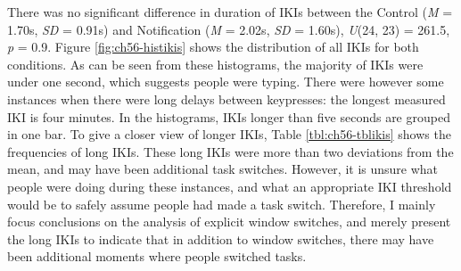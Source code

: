 There was no significant difference in duration of IKIs between the Control (\textit{M} = 1.70s, \textit{SD} = 0.91s) and Notification (\textit{M} = 2.02s, \textit{SD} = 1.60s), \textit{U}(24, 23) = 261.5, \textit{p} = 0.9. Figure \ref{fig:ch56-histikis} shows the distribution of all IKIs for both conditions. As can be seen from these histograms, the majority of IKIs were under one second, which suggests people were typing. There were however some instances when there were long delays between keypresses: the longest measured IKI is four minutes. In the histograms, IKIs longer than five seconds are grouped in one bar. To give a closer view of longer IKIs, Table \ref{tbl:ch56-tblikis} shows the frequencies of long IKIs. These long IKIs were more than two deviations from the mean, and may have been additional task switches. However, it is unsure what people were doing during these instances, and what an appropriate IKI threshold would be to safely assume people had made a task switch. Therefore, I mainly focus conclusions on the analysis of explicit window switches, and merely present the long IKIs to indicate that in addition to window switches, there may have been additional moments where people switched tasks. 

